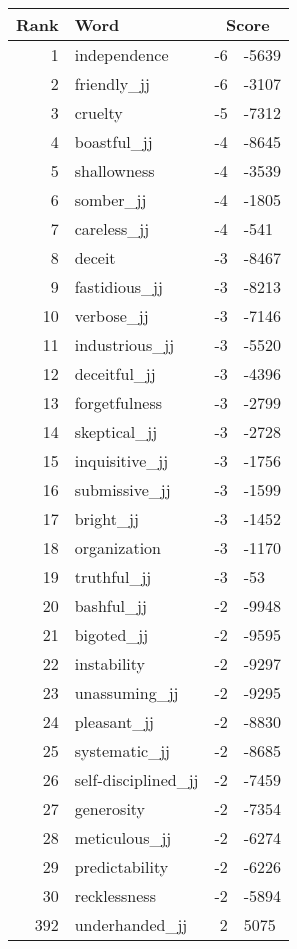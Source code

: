 \begin{longtable}[!htbp]{| rlr@{.}l |}
    \hline
    \textbf{Rank} & \textbf{Word} & \multicolumn{2}{c|}{\textbf{Score}} \\
    \hline
    \endhead
    1 & independence & -6 & -5639 \\
    2 & friendly\_jj & -6 & -3107 \\
    3 & cruelty & -5 & -7312 \\
    4 & boastful\_jj & -4 & -8645 \\
    5 & shallowness & -4 & -3539 \\
    6 & somber\_jj & -4 & -1805 \\
    7 & careless\_jj & -4 & -541 \\
    8 & deceit & -3 & -8467 \\
    9 & fastidious\_jj & -3 & -8213 \\
    10 & verbose\_jj & -3 & -7146 \\
    11 & industrious\_jj & -3 & -5520 \\
    12 & deceitful\_jj & -3 & -4396 \\
    13 & forgetfulness & -3 & -2799 \\
    14 & skeptical\_jj & -3 & -2728 \\
    15 & inquisitive\_jj & -3 & -1756 \\
    16 & submissive\_jj & -3 & -1599 \\
    17 & bright\_jj & -3 & -1452 \\
    18 & organization & -3 & -1170 \\
    19 & truthful\_jj & -3 & -53 \\
    20 & bashful\_jj & -2 & -9948 \\
    21 & bigoted\_jj & -2 & -9595 \\
    22 & instability & -2 & -9297 \\
    23 & unassuming\_jj & -2 & -9295 \\
    24 & pleasant\_jj & -2 & -8830 \\
    25 & systematic\_jj & -2 & -8685 \\
    26 & self-disciplined\_jj & -2 & -7459 \\
    27 & generosity & -2 & -7354 \\
    28 & meticulous\_jj & -2 & -6274 \\
    29 & predictability & -2 & -6226 \\
    30 & recklessness & -2 & -5894 \\
    392 & underhanded\_jj & 2 & 5075 \\

\end{longtable}
